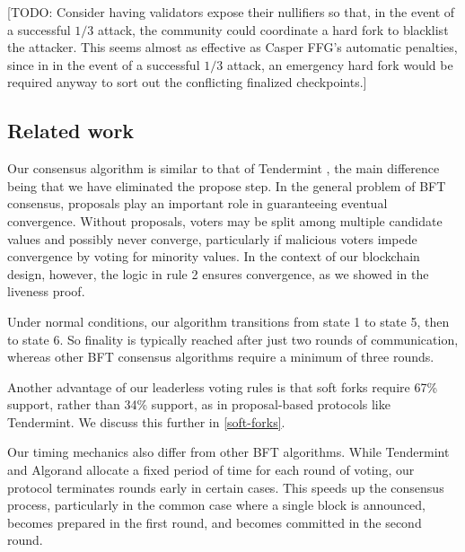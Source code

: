 [TODO: Consider having validators expose their nullifiers so that, in the event of a successful $1/3$ attack, the community could coordinate a hard fork to blacklist the attacker. This seems almost as effective as Casper FFG's automatic penalties, since in in the event of a successful $1/3$ attack, an emergency hard fork would be required anyway to sort out the conflicting finalized checkpoints.]


\subsection{Related work}

Our consensus algorithm is similar to that of Tendermint \cite{kwon2014tendermint}, the main difference being that we have eliminated the propose step. In the general problem of BFT consensus, proposals play an important role in guaranteeing eventual convergence. Without proposals, voters may be split among multiple candidate values and possibly never converge, particularly if malicious voters impede convergence by voting for minority values. In the context of our blockchain design, however, the logic in rule 2 ensures convergence, as we showed in the liveness proof.

Under normal conditions, our algorithm transitions from state 1 to state 5, then to state 6. So finality is typically reached after just two rounds of communication, whereas other BFT consensus algorithms require a minimum of three rounds.

Another advantage of our leaderless voting rules is that soft forks require 67\% support, rather than 34\% support, as in proposal-based protocols like Tendermint. We discuss this further in \autoref{soft-forks}.

Our timing mechanics also differ from other BFT algorithms. While Tendermint and Algorand allocate a fixed period of time for each round of voting, our protocol terminates rounds early in certain cases. This speeds up the consensus process, particularly in the common case where a single block is announced, becomes prepared in the first round, and becomes committed in the second round.
